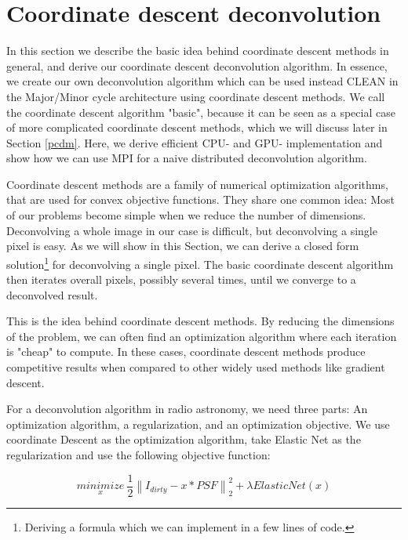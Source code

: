 \section{Coordinate descent deconvolution}\label{cd}
In this section we describe the basic idea behind coordinate descent methods in general, and derive our coordinate descent deconvolution algorithm. In essence, we create our own deconvolution algorithm which can be used instead CLEAN in the Major/Minor cycle architecture using coordinate descent methods. We call the coordinate descent algorithm "basic", because it can be seen as a special case of more complicated coordinate descent methods\cite{richtarik2016distributed, richtarik2016parallel}, which we will discuss later in Section \ref{pcdm}. Here, we derive efficient CPU- and GPU- implementation and show how we can use MPI for a naive distributed deconvolution algorithm.

Coordinate descent methods are a family of numerical optimization algorithms, that are used for convex objective functions. They share one common idea: Most of our problems become simple when we reduce the number of dimensions. Deconvolving a whole image in our case is difficult, but deconvolving a single pixel is easy. As we will show in this Section, we can derive a closed form solution\footnote{Deriving a formula which we can implement in a few lines of code.} for deconvolving a single pixel. The basic coordinate descent algorithm then iterates overall pixels, possibly several times, until we converge to a deconvolved result. 

This is the idea behind coordinate descent methods. By reducing the dimensions of the problem, we can often find an optimization algorithm where each iteration is "cheap" to compute. In these cases, coordinate descent methods produce competitive results when compared to other widely used methods like gradient descent\cite{nesterov2012efficiency, nesterov2013gradient}.


For a deconvolution algorithm in radio astronomy, we need three parts: An optimization algorithm, a regularization, and an optimization objective. We use coordinate Descent as the optimization algorithm, take Elastic Net as the regularization and use the following objective function:

\begin{equation}\label{cd:deconv}
\underset{x}{minimize} \: \frac{1}{2} \left \| I_{dirty} - x * PSF \right \|_2^2 + \lambda ElasticNet(x)
\end{equation}

